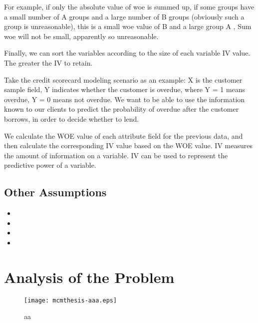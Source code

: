 \documentclass{mcmthesis}
\begin{document}
For example, if only the absolute value of woe is summed up, if some groups have a small number of A groups and a large number of B groups (obviously such a group is unreasonable), this is a small woe value of B and a large group A , Sum woe will not be small, apparently so unreasonable.

Finally, we can sort the variables according to the size of each variable IV value. The greater the IV to retain.

Take the credit scorecard modeling scenario as an example: X is the customer sample field, Y indicates whether the customer is overdue, where Y = 1 means overdue, Y = 0 means not overdue. We want to be able to use the information known to our clients to predict the probability of overdue after the customer borrows, in order to decide whether to lend.

We calculate the WOE value of each attribute field for the previous data, and then calculate the corresponding IV value based on the WOE value. IV measures the amount of information on a variable. IV can be used to represent the predictive power of a variable.


\subsection{Other Assumptions}
\lipsum[6]
\begin{itemize}
\item
\item
\item
\item
\end{itemize}

\lipsum[7]

\section{Analysis of the Problem}
\begin{figure}[h]
\small
\centering
\texttt{[image: mcmthesis-aaa.eps]}
\caption{aa} \label{fig:aa}
\end{figure}
\end{document}
